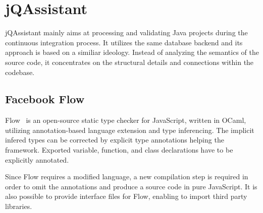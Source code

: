 \section{jQAssistant}

jQAssistant mainly aims at processing and validating Java projects during the continuous integration process. It utilizes the same database backend and its approach is based on a similiar ideology. Instead of analyzing the semantics of the source code, it concentrates on the structural details and connections within the codebase.


\subsection{Facebook Flow}
Flow~\cite{flow} is an open-source static type checker for JavaScript, written in OCaml, utilizing annotation-based language extension and type inferencing. The implicit infered types can be corrected by explicit type annotations helping the framework. Exported variable, function, and class declarations have to be explicitly annotated.

Since Flow requires a modified language, a new compilation step is required in order to omit the annotations and produce a source code in pure JavaScript.
It is also possible to provide interface files for Flow, enabling to import third party libraries.

